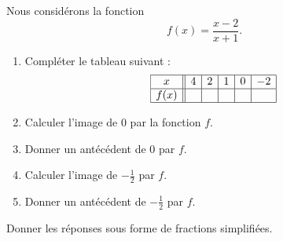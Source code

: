
\begin{exercice}\label{exosmath-0368}

    Nous considérons la fonction
    \begin{equation}
        f(x)=\frac{ x-2 }{ x+1 }.
    \end{equation}
    \begin{enumerate}
        \item
            Compléter le tableau suivant :
            \begin{equation*}
                \begin{array}[]{|c||c|c|c|c|c|}
                    \hline
                     x&4&2&1&0&-2\\
                      \hline
                      f(x)&&&&&\\ 
                      \hline 
                   \end{array}
               \end{equation*}
           \item
               Calculer l'image de \( 0\) par la fonction \( f\).
           \item
               Donner un antécédent de \( 0\) par \( f\).
           \item
               Calculer l'image de \( -\frac{ 1 }{2}\) par \( f\).
           \item
               Donner un antécédent de \( -\frac{ 1 }{2}\) par \( f\).

    \end{enumerate}
    Donner les réponses sous forme de fractions simplifiées.

\end{exercice}
